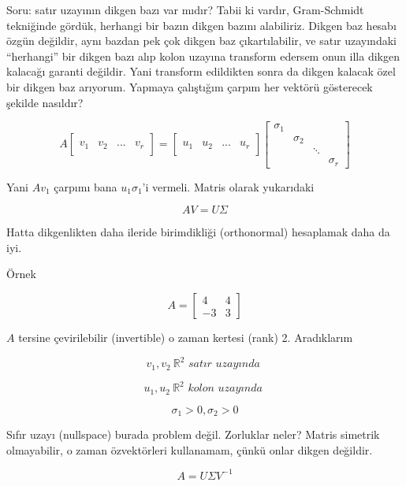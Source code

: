 \documentclass[12pt,fleqn]{article}\usepackage{../../common}
\begin{document}
Soru: satır uzayının dikgen bazı var mıdır? Tabii ki vardır,
Gram-Schmidt tekniğinde gördük, herhangi bir bazın dikgen bazını
alabiliriz. Dikgen baz hesabı özgün değildir, aynı bazdan pek çok
dikgen baz çıkartılabilir, ve satır uzayındaki ``herhangi'' bir
dikgen bazı alıp kolon uzayına transform edersem onun illa dikgen
kalacağı garanti değildir. Yani transform edildikten sonra da dikgen
kalacak özel bir dikgen baz arıyorum. Yapmaya çalıştığım çarpım her
vektörü gösterecek şekilde nasıldır?

$$ 
A \left[\begin{array}{rrrr}
& & & \\ v_1 & v_2 & ... & v_r 
\\ & & & 
\end{array}\right] = 
\left[\begin{array}{rrrr}
& & & \\ u_1 & u_2& ... & u_r \\ 
& & & 
\end{array}\right] 
\left[\begin{array}{rrrr}
\sigma_1 & & & \\  
& \sigma_2&  & \\ 
& & \ddots & \\ 
& & & \sigma_r
\end{array}\right] 
$$

Yani $Av_1$ çarpımı bana $u_1 \sigma_1$'i vermeli. Matris olarak yukarıdaki 

$$ AV = U\Sigma $$

Hatta dikgenlikten daha ileride birimdikliği (orthonormal) hesaplamak daha
da iyi.

Örnek 

$$ 
A = 
\left[\begin{array}{rr}
4 & 4 \\ -3 & 3
\end{array}\right]
 $$

$A$ tersine çevirilebilir (invertible) o zaman kertesi (rank)
2. Aradıklarım 

$$ v_1,v_2 \  \mathbb{R}^2 \textit{ satır uzayında }  $$

$$ u_1,u_2 \  \mathbb{R}^2 \textit{ kolon uzayında }  $$

$$ \sigma_1 > 0, \sigma_2 > 0 $$

Sıfır uzayı (nullspace) burada problem değil. Zorluklar neler? Matris
simetrik olmayabilir, o zaman özvektörleri kullanamam, çünkü onlar
dikgen değildir.

$$ A = U \Sigma V^{-1} $$
\end{document}
